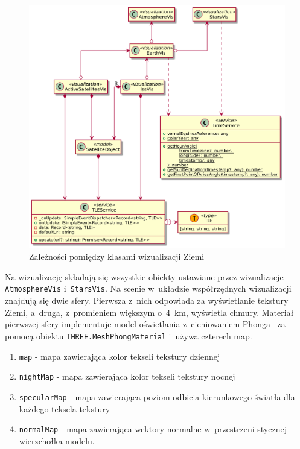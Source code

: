 \begin{figure}
  \centering
  \includegraphics[width=\textwidth]{diagrams/out/c4_earthVis.png}
  \caption{Zależności pomiędzy klasami wizualizacji Ziemi}
  \label{fig:c4_earthVis} 
\end{figure}

Na wizualizację składają się wszystkie obiekty ustawiane przez wizualizacje \texttt{AtmosphereVis} i~\texttt{StarsVis}. Na scenie w~układzie współrzędnych wizualizacji znajdują się dwie sfery. Pierwsza z~nich odpowiada za wyświetlanie tekstury Ziemi, a~druga, z~promieniem większym o~$4$~km, wyświetla chmury. Materiał pierwszej sfery implementuje model oświetlania z~cieniowaniem Phonga~\cite[Rozdział 3]{RealTime3DGraphics} za pomocą obiektu \texttt{THREE.MeshPhongMaterial} i~używa czterech map.
\begin{enumerate}
  \item \texttt{map} - mapa zawierająca kolor tekseli tekstury dziennej
  \item \texttt{nightMap} - mapa zawierająca kolor tekseli tekstury nocnej
  \item \texttt{specularMap} - mapa zawierająca poziom odbicia kierunkowego światła dla każdego teksela tekstury
  \item \texttt{normalMap} - mapa zawierająca wektory normalne w~przestrzeni stycznej wierzchołka modelu.
\end{enumerate}

